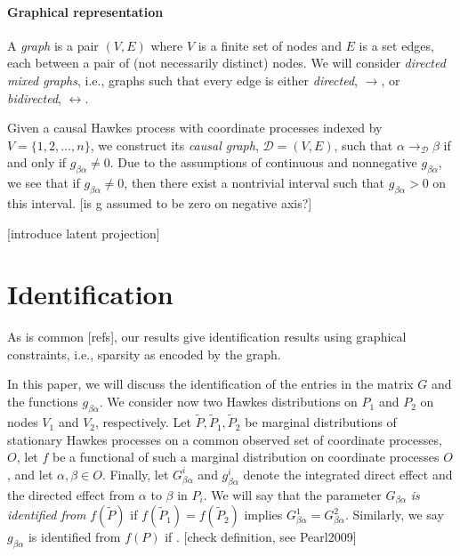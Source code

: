 \documentclass[accepted]{uai2021} %
\begin{document}

\paragraph{Graphical representation}

A {\it graph} is a pair $(V,E)$ where $V$ is a finite set of nodes and $E$ is a 
set edges, each between a pair of (not necessarily distinct) nodes. We will  
consider {\it directed mixed graphs}, i.e., graphs such that every edge is 
either \emph{directed}, $\rightarrow$, or \emph{bidirected}, $\leftrightarrow$. 

Given a causal Hawkes process with coordinate processes indexed by $V = 
\{1,2,\ldots,n\}$, we construct its \emph{causal graph}, $\mathcal{D} = (V,E)$, 
such that 
$\alpha \rightarrow_\mathcal{D} \beta$ if and only if $g_{\beta\alpha} \neq 0$. 
Due 
to the assumptions of continuous and nonnegative $g_{\beta\alpha}$, we see 
that if $g_{\beta\alpha}\neq 0$, then there exist a nontrivial interval such 
that $g_{\beta\alpha} > 0$ on this interval. [is g assumed to be zero on 
negative axis?]

[introduce latent projection]



\section{Identification}

As is common [refs], our results give identification results using graphical 
constraints, i.e., sparsity as encoded by the graph.

In this paper, we will discuss the identification of the entries in the 
matrix $G$ and the functions $g_{\beta\alpha}$. We consider now two Hawkes 
distributions on $P_1$ and $P_2$ on nodes $V_1$ and $V_2$, respectively. Let 
$\tilde{P}, \tilde{P}_1, \tilde{P}_2$ be marginal 
distributions of stationary Hawkes processes on a common observed set of 
coordinate processes, $O$, let $f$ be a functional of 
such a marginal distribution on coordinate processes $O$, and let 
$\alpha,\beta\in O$. Finally, let $G_{\beta\alpha}^i$ and $g_{\beta\alpha}^i$ 
denote the integrated direct effect and the directed effect from $\alpha$ to 
$\beta$ in $P_i$. We will say that the parameter $G_{\beta\alpha}$ \emph{is 
identified from} 
$f(\tilde{P})$ if $f(\tilde{P}_1) = f(\tilde{P}_2)$ 
implies $G_{\beta\alpha}^1 = G_{\beta\alpha}^2$. Similarly, we say 
$g_{\beta\alpha}$ is identified from $f(P)$ if . [check definition, see 
Pearl2009]
\end{document}
